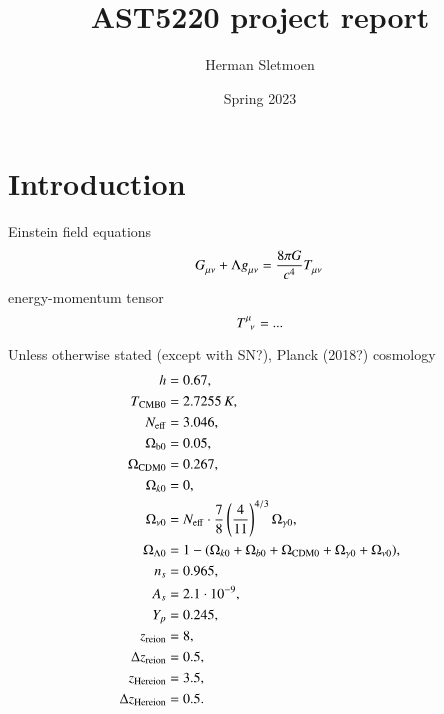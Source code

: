 \documentclass{aa}
\begin{document}
\title{AST5220 project report}
\author{Herman Sletmoen}

\date{Spring 2023}

\iffalse
\abstract
{Solve Einstein-Boltzmann equations}
{Solve Einstein-Boltzmann equations}
{Solve Einstein-Boltzmann equations}
{Solve Einstein-Boltzmann equations}
{Solve Einstein-Boltzmann equations}
\fi


\maketitle
%

\section{Introduction}


Einstein field equations
\begin{equation}
	G\indices{_\mu_\nu} + \Lambda g\indices{_\mu_\nu} = \frac{8 \pi G}{c^4} T\indices{_\mu_\nu}
\label{eq_einstein}
\end{equation}
energy-momentum tensor
\begin{equation}
	T\indices{^\mu_\nu} = ...
\label{eq_energy_momentum}
\end{equation}

Unless otherwise stated (except with SN?),
Planck (2018?) cosmology
\begin{equation}
\begin{aligned}
h &= 0.67, \\
T_{\rm CMB 0} &= 2.7255\,K, \\
N_{\rm eff} &= 3.046, \\
\Omega_{\rm b 0} &= 0.05, \\
\Omega_{\rm CDM 0} &= 0.267,\\
\Omega_{k 0} &= 0, \\
\Omega_{\nu 0} &= N_{\rm eff}\cdot \frac{7}{8}\left(\frac{4}{11}\right)^{4/3}\Omega_{\gamma 0}, \\
\Omega_{\Lambda 0} &= 1 - (\Omega_{k 0}+\Omega_{b 0}+\Omega_{\rm CDM 0}+\Omega_{\gamma 0}+\Omega_{\nu 0}),\\
n_s &= 0.965, \\
A_s &= 2.1\cdot 10^{-9}, \\
Y_p &= 0.245, \\
z_{\rm reion} &= 8, \\
\Delta z_{\rm reion} &= 0.5, \\
z_{\rm He reion} &= 3.5, \\
\Delta z_{\rm He reion} &= 0.5.
\end{aligned}
\label{eq_planck2018}
\end{equation}
\end{document}
